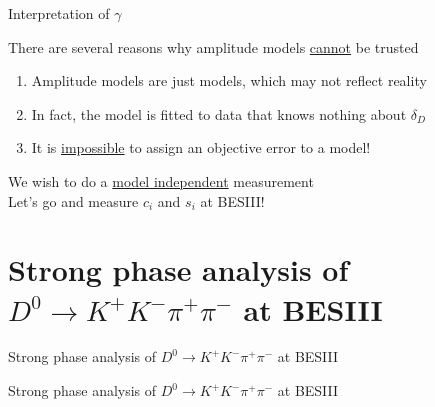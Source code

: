 \documentclass{beamer}
\begin{document}
\begin{frame}{Interpretation of $\gamma$}
  \begin{center}
    {\Large There are several reasons why amplitude models \underline{cannot} be trusted}
  \end{center}
  \begin{enumerate}
    \setlength\itemsep{1.0em}
    \item{Amplitude models are just models, which may not reflect reality}
    \item{In fact, the model is fitted to data that knows nothing about $\delta_D$}
    \item{It is \underline{impossible} to assign an objective error to a model!}
  \end{enumerate}
  \vspace{0.5cm}
  \begin{center}
    \large We wish to do a \underline{model independent} measurement\\
    \Large Let's go and measure $c_i$ and $s_i$ at BESIII!
  \end{center}
\end{frame}

\section{Strong phase analysis of \texorpdfstring{$D^0\to K^+K^-\pi^+\pi^-$}{D2KKpipi} at BESIII}
\begin{frame}{Strong phase analysis of $D^0\to K^+K^-\pi^+\pi^-$ at BESIII}
  \begin{center}
    {\huge Strong phase analysis of $D^0\to K^+K^-\pi^+\pi^-$ at BESIII}
  \end{center}
\end{frame}
\end{document}
